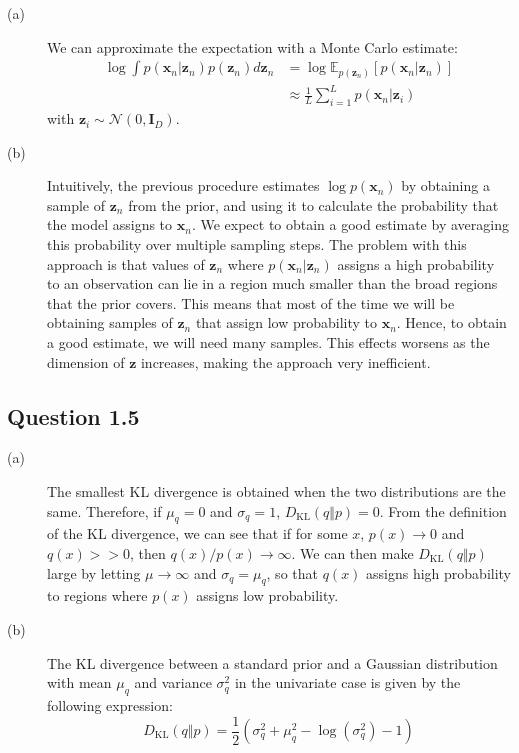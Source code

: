 \documentclass{article}
\begin{document}
\begin{description}
\item[(a)] We can approximate the expectation with a Monte Carlo estimate:
\begin{align*}
\log\int p(\mathbf{x}_n\vert\mathbf{z}_n)p(\mathbf{z}_n)d\mathbf{z}_n &= \log\mathbb{E}_{p(\mathbf{z}_n)}[p(\mathbf{x}_n\vert\mathbf{z}_n)] \\
&\approx \frac{1}{L}\sum_{i=1}^{L} p(\mathbf{x}_n\vert\mathbf{z}_i)
\end{align*}
with $\mathbf{z}_i\sim\mathcal{N}(0, \mathbf{I}_D)$.

\item[(b)] Intuitively, the previous procedure estimates $\log p(\mathbf{x}_n)$ by obtaining a sample of $\mathbf{z}_n$ from the prior, and using it to calculate the probability that the model assigns to $\mathbf{x}_n$. We expect to obtain a good estimate by averaging this probability over multiple sampling steps. The problem with this approach is that values of $\mathbf{z}_n$ where $p(\mathbf{x}_n\vert\mathbf{z}_n)$ assigns a high probability to an observation can lie in a region much smaller than the broad regions that the prior covers. This means that most of the time we will be obtaining samples of $\mathbf{z}_n$ that assign low probability to $\mathbf{x}_n$. Hence, to obtain a good estimate, we will need many samples. This effects worsens as the dimension of $\mathbf{z}$ increases, making the approach very inefficient.
\end{description}

\subsection*{Question 1.5}

\begin{description}
\item[(a)] The smallest KL divergence is obtained when the two distributions are the same. Therefore, if $\mu_q = 0$ and $\sigma_q=1$, $D_{\text{KL}}(q\Vert p) = 0$.
From the definition of the KL divergence, we can see that if for some $x$, $p(x)\rightarrow 0$ and $q(x)>>0$, then $q(x)/p(x)\rightarrow\infty$. We can then make $D_{\text{KL}}(q\Vert p)$ large by letting $\mu\rightarrow\infty$ and $\sigma_q = \mu_q$, so that $q(x)$ assigns high probability to regions where $p(x)$ assigns low probability.

\item[(b)] The KL divergence between a standard prior and a Gaussian distribution with mean $\mu_q$ and variance $\sigma_q^2$ in the univariate case is given by the following expression:
\begin{equation*}
D_{\text{KL}}(q\Vert p) = \frac{1}{2}(\sigma_q^2 + \mu_q^2 - \log(\sigma_q^2) - 1)
\end{equation*}
\end{description}
\end{document}
